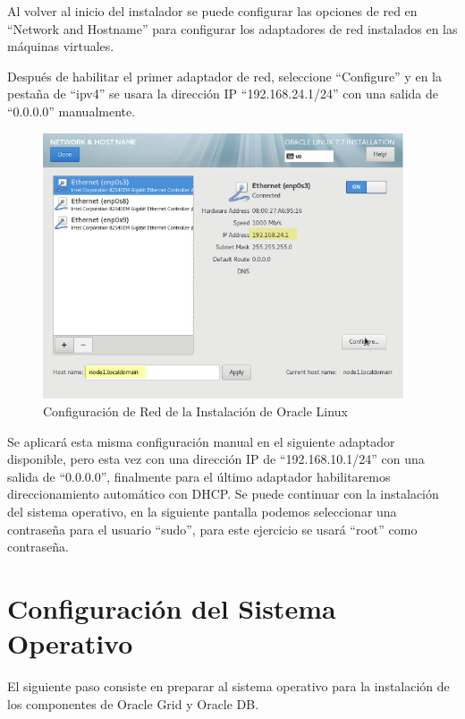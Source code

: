 \documentclass{article}
\begin{document}
Al volver al inicio del instalador se puede configurar las opciones de red en ``Network and Hostname'' para configurar los adaptadores de red instalados en las máquinas virtuales. 

Después de habilitar el primer adaptador de red, seleccione ``Configure'' y en la pestaña de ``ipv4'' se usara la dirección IP ``192.168.24.1/24'' con una salida de ``0.0.0.0''  manualmente.

\begin{figure}[H]
	\begin{center}
		\includegraphics[width=0.95\textwidth]{vm_networking.png}
	\end{center}
	\caption{Configuración de Red de la Instalación de Oracle Linux}
\end{figure}

Se aplicará esta misma configuración manual en el siguiente adaptador disponible, pero esta vez con una dirección IP de ``192.168.10.1/24'' con una salida de ``0.0.0.0'', finalmente para el último adaptador habilitaremos direccionamiento automático con DHCP. Se puede continuar con la instalación del sistema operativo, en la siguiente pantalla podemos seleccionar una contraseña para el usuario ``sudo'', para este ejercicio se usará ``root'' como contraseña.

\section{Configuración del Sistema Operativo}

El siguiente paso consiste en preparar al sistema operativo para la instalación de los componentes de Oracle Grid y Oracle DB.
\end{document}
